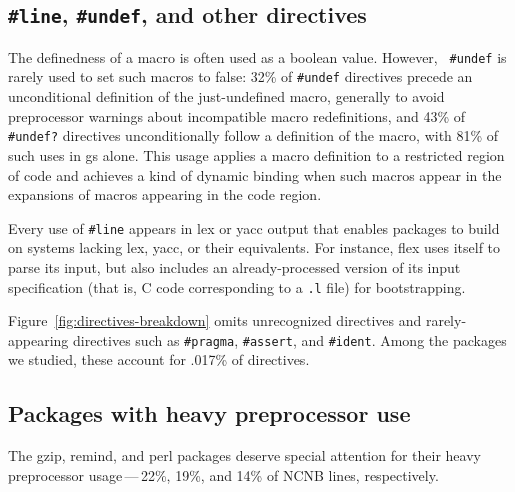 \documentclass[10pt]{article}
\newcommand{\pkg}[1]{\textsf{#1}}
\begin{document}
\subsection{{\tt \#line}, {\tt \#undef}, and other directives}



The definedness of a macro is often used as a boolean value.  However, {\tt
\#undef} is rarely used to set such macros to false:   32\% of {\tt \#undef}
directives precede an unconditional definition of the just-undefined macro,
generally to avoid preprocessor warnings about incompatible macro
redefinitions, and 43\% of {\tt \#undef?} directives unconditionally follow
a definition of the macro, with 81\% of such uses in \pkg{gs} alone.  This
usage applies a macro definition to a restricted region of code and
achieves a kind of dynamic binding when such macros appear in the
expansions of macros appearing in the code region.

Every use of {\tt \#line} appears in lex or yacc
output that enables packages to build on systems lacking lex, yacc, or
their equivalents.  For instance, \pkg{flex} uses itself to parse its
input, but also includes an already-processed version of its input
specification (that is, C code corresponding to a {\tt .l} file) for
bootstrapping.




Figure~\ref{fig:directives-breakdown} omits unrecognized directives and
rarely-appearing directives such as {\tt \#pragma}, {\tt \#assert}, and
{\tt \#ident}.  Among the packages we studied, these account for
.017\% of directives.


\subsection{Packages with heavy preprocessor use}


The \pkg{gzip}, \pkg{remind}, and \pkg{perl} packages deserve
special attention for their heavy preprocessor usage\,---\,22\%, 19\%, and
14\% of NCNB lines, respectively.
\end{document}
